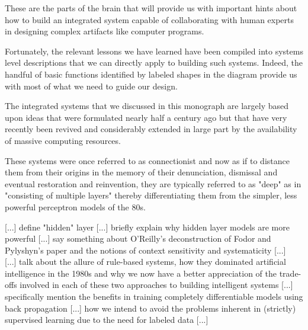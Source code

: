 \documentclass[letterpaper,12pt]{article}
\begin{document}
These are the parts of the brain that will provide us with important hints about how to build an integrated system capable of collaborating with human experts in designing complex artifacts like computer programs.

Fortunately, the relevant lessons we have learned have been compiled into systems level descriptions that we can directly apply to building such systems. Indeed, the handful of basic functions identified by labeled shapes in the diagram provide us with most of what we need to guide our design.

The integrated systems that we discussed in this monograph are largely based upon ideas that were formulated nearly half a century ago but that have very recently been revived and considerably extended in large part by the availability of massive computing resources.

These systems were once referred to as connectionist and now as if to distance them from their origins in the memory of their denunciation, dismissal and eventual restoration and reinvention, they are typically referred to as "deep" as in "consisting of multiple layers" thereby differentiating them from the simpler, less powerful perceptron models of the 80s.

[...] define "hidden" layer [...] briefly explain why hidden layer models are more powerful [...] say something about O'Reilly's deconstruction of Fodor and Pylyshyn’s paper and the notions of context sensitivity and systematicity [...] ~\cite{FodorandPylyshynCOGNITION-88,CalvoandSymonsTACO-14,OReillyetalTACO-14} [...] talk about the allure of rule-based systems, how they dominated artificial intelligence in the 1980s and why we now have a better appreciation of the trade-offs involved in each of these two approaches to building intelligent systems [...] specifically mention the benefits in training completely differentiable models using back propagation [...] how we intend to avoid the problems inherent in (strictly) supervised learning due to the need for labeled data [...]





\end{document}
